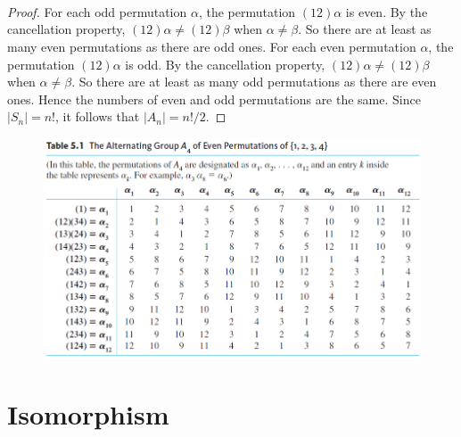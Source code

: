 \documentclass{article}
\newtheorem{theorem}{Theorem}[section]
\theoremstyle{definition}
\newtheorem{definition}{Definition}[section]
\begin{document}
 \noindent{}
 \\ \\ \\
 
 \begin{proof}
     For each odd permutation $\alpha$, the permutation $(12)\alpha$ is even. By the cancellation property, $(12)\alpha \neq (12)\beta$ when $\alpha \neq \beta$. So there are at least as many even permutations as there are odd ones. For each even permutation $\alpha$, the permutation $(12)\alpha$ is odd. By the cancellation property, $(12)\alpha \neq (12)\beta$ when $\alpha \neq \beta$. So there are at least as many odd permutations as there are even ones. Hence the numbers of even and odd permutations are the same. Since $|S_n| = n!$, it follows that $|A_n| = n!/2$.
 \end{proof}
 
 \begin{figure}[!ht]
     \centering
     \includegraphics[width=\linewidth]{figures/A_4_table.png}
     \caption{}
     \label{A_4_table}
 \end{figure}
 
 \section{Isomorphism}
\end{document}
